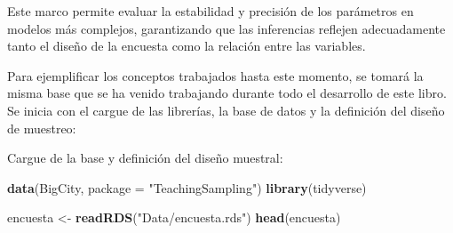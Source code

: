 \documentclass[
  12pt,
]{book}
\newenvironment{Shaded}{\begin{snugshade}}{\end{snugshade}}
\newcommand{\AttributeTok}[1]{\textcolor[rgb]{0.13,0.29,0.53}{#1}}
\newcommand{\ConstantTok}[1]{\textcolor[rgb]{0.56,0.35,0.01}{#1}}
\newcommand{\DecValTok}[1]{\textcolor[rgb]{0.00,0.00,0.81}{#1}}
\newcommand{\FunctionTok}[1]{\textcolor[rgb]{0.13,0.29,0.53}{\textbf{#1}}}
\newcommand{\NormalTok}[1]{#1}
\newcommand{\OtherTok}[1]{\textcolor[rgb]{0.56,0.35,0.01}{#1}}
\newcommand{\SpecialCharTok}[1]{\textcolor[rgb]{0.81,0.36,0.00}{\textbf{#1}}}
\newcommand{\StringTok}[1]{\textcolor[rgb]{0.31,0.60,0.02}{#1}}
\begin{document}
Este marco permite evaluar la estabilidad y precisión de los parámetros en modelos más complejos, garantizando que las inferencias reflejen adecuadamente tanto el diseño de la encuesta como la relación entre las variables.

Para ejemplificar los conceptos trabajados hasta este momento, se tomará la misma base que se ha venido trabajando durante todo el desarrollo de este libro. Se inicia con el cargue de las librerías, la base de datos y la definición del diseño de muestreo:

\begin{Shaded}
\end{Shaded}

Cargue de la base y definición del diseño muestral:

\begin{Shaded}
\begin{Highlighting}[]
\FunctionTok{data}\NormalTok{(BigCity, }\AttributeTok{package =} \StringTok{"TeachingSampling"}\NormalTok{)}
\FunctionTok{library}\NormalTok{(tidyverse)}

\NormalTok{encuesta }\OtherTok{\textless{}{-}} \FunctionTok{readRDS}\NormalTok{(}\StringTok{"Data/encuesta.rds"}\NormalTok{)}
\FunctionTok{head}\NormalTok{(encuesta)}
\end{Highlighting}
\end{Shaded}
\end{document}

